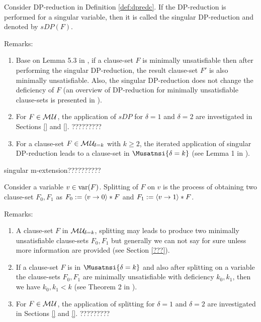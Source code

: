 \documentclass{report}
\begin{document}
\begin{defi}\label{def:singularDP}
Consider DP-reduction in Definition \ref{def:dpredc}. If the DP-reduction is performed for a singular variable, then it is called the singular DP-reduction and denoted by $sDP(F)$.
\end{defi}
Remarks:
  \begin{enumerate}
  \item Base on Lemma 5.3 in \cite{h9}, if a clause-set $F$ is minimally unsatisfiable then after performing the singular DP-reduction, the result clause-set $F'$ is also minimally unsatisfiable. Also, the singular DP-reduction does not change the deficiency of $F$ (an overview of DP-reduction for minimally unsatisfiable clause-sets is presented in \cite{h29}).
  \item For $F \in \mathcal{M\hspace{0.8pt}U}$, the application of $sDP$ for $\delta=1$ and $\delta=2$ are investigated in Sections \ref{} and \ref{}. ?????????
  \item For a clause-set $F \in \mathcal{M\hspace{0.8pt}U}_{\!\delta=k}$ with $k \ge 2$, the iterated application of singular DP-reduction leads to a clause-set in $\Musatnsi{\delta=k}$ (see Lemma 1 in \cite{h24}).
  \end{enumerate}

\begin{defi}\label{def:singularextn}
singular m-extension??????????
\end{defi}

\begin{defi}\label{def:splitting}
Consider a variable $v \in \operatorname{var}(F)$. Splitting of $F$ on $v$ is the process of obtaining two clause-set $F_0,F_1$ as  $F_0:=\langle v \rightarrow 0 \rangle * F$ and $F_1:=\langle v \rightarrow 1 \rangle * F$.
\end{defi}
Remarks:
  \begin{enumerate}
  \item A clause-set $F$ in $\mathcal{M\hspace{0.8pt}U}_{\!\delta=k}$, splitting may leads to produce two minimally unsatisfiable clause-sets $F_0,F_1$ but generally we can not say for sure unless more information are provided (see Section \ref{???}). 
  \item If a clause-set $F$ is in $\Musatnsi{\delta=k}$ and also after splitting on a variable the clause-sets $F_0,F_1$ are minimally unsatisfiable with deficiency $k_0, k_1$, then we have $k_0, k_1 < k$ (see Theorem 2 in \cite{h24}).
  \item For $F \in \mathcal{M\hspace{0.8pt}U}$, the application of splitting for $\delta=1$ and $\delta=2$ are investigated in Sections \ref{} and \ref{}. ?????????
  \end{enumerate}
\end{document}
